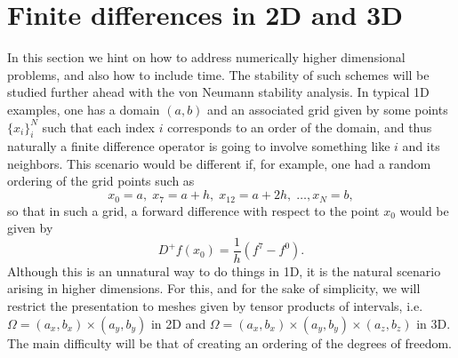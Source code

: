 \section{Finite differences in 2D and 3D}
In this section we hint on how to address numerically higher dimensional problems, and also how to include time. The stability of such schemes will be studied further ahead with the von Neumann stability analysis. In typical 1D examples, one has a domain $(a,b)$ and an associated grid given by some points $\{x_i\}_i^N$ such that each index $i$ corresponds to an order of the domain, and thus naturally a finite difference operator is going to involve something like $i$ and its neighbors. This scenario would be different if, for example, one had a random ordering of the grid points such as
    \begin{equation*}
        x_0 = a,\; x_7 = a + h,\; x_{12} = a + 2h,\; \hdots, x_N = b,
    \end{equation*}
so that in such a grid, a forward difference with respect to the point $x_0$ would be given by
    \begin{equation*}
        D^+f(x_0) = \frac 1 h \left( f^7 - f^0 \right).
    \end{equation*}
Although this is an unnatural way to do things in 1D, it is the natural scenario arising in higher dimensions. For this, and for the sake of simplicity, we will restrict the presentation to meshes given by tensor products of intervals, i.e. $\Omega = (a_x, b_x) \times (a_y, b_y)$ in 2D and $\Omega = (a_x, b_x) \times (a_y, b_y) \times (a_z, b_z)$ in 3D. The main difficulty will be that of creating an ordering of the degrees of freedom.

